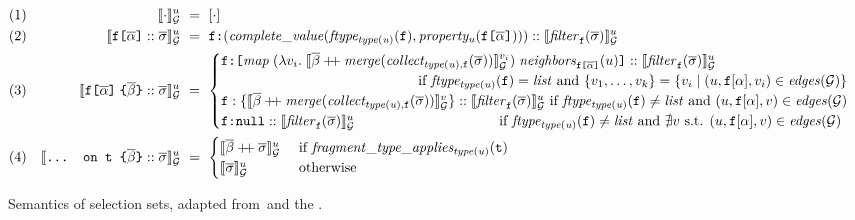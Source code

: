 \begin{figure}[h!]
  \small
  \begin{flushright}
  \end{flushright}
\centering
    \begin{align*}
    & (1) & \eval{\cdot}{u} &~=~ [\cdot] \\
    & (2) & \evalu{\fld :: \sset} &~=~ 
        \resp{(\mathit{complete\_value(ftype_{type(u)}(\texttt{f}), property_{u}(\fld))})} :: \evalfilteru{\sset}{\fkey}  \\
    & (3) & \evalu{\nfld{\overline{\beta}} :: \sset} &~=~
    \begin{cases}
        \resp{\texttt{[} \mathit{map}\; (\lambda v_{i}.\; \eval{\overline{\beta} \mdoubleplus \mathit{merge (collect_{type(u), \fkey} (\sset))}}{v_{i}})\; \mathit{neighbors}_{\fld}(u) \texttt{]}} :: \evalfilteru{\sset}{\fkey} \\  
         \hfill \text{ if } 
            \mathit{ftype_{type(u)}(\fkey)} = \mathit{list} \text{ and } \{v_{1}, \ldots, v_{k}\} = 
        \{v_{i} \mid (u, \fkey[\alpha], v_{i}) \in \mathit{edges}(\graph)\} \\
    \fkey:\{\eval{\overline{\beta} \mdoubleplus \mathit{merge (collect_{type(u), \fkey} (\sset))}}{v}\} ::  \evalfilteru{\sset}{\fkey}  
         \hfill \text{ if } 
        \mathit{ftype_{type(u)}(\fkey)}  \neq \mathit{list} \text{ and } (u, \fkey[\alpha], v) \in \mathit{edges}(\graph) \\
    \resp{\nval} :: \evalfilteru{\sset}{\fkey} 
    \qquad \qquad \qquad \qquad \qquad
  \text{ if } \mathit{ftype_{type(u)}(\fkey)}  \neq \mathit{list}  \text{ and } \nexists v \text{ s.t. }  (u, \fkey[\alpha], v) \in \mathit{edges}(\graph) \\
    \end{cases}\\
    & (4) & \evalu{\ifrag{t}{\overline{\beta}} :: \sset} &~=~ 
    \begin{cases}
    \evalu{\overline{\beta} \mdoubleplus \sset} 
     & \text{ if }\mathit{fragment\_type\_applies_{type(u)}(\texttt{t})}\\
    \evalu{\sset} 
    & \text{ otherwise}
    \end{cases}
    \end{align*}
    \caption{Semantics of \gql selection sets, adapted from~\HP and the \spec. 
}
\end{figure}
